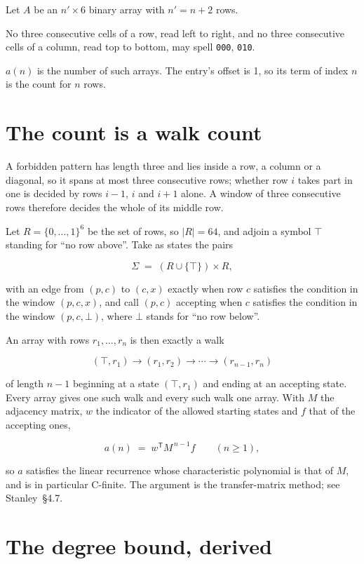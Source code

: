 \documentclass[11pt]{article}
\theoremstyle{definition}
\begin{document}
Let $A$ be an $n' \times 6$ binary array with $n' = n + 2$ rows.

No three consecutive cells of a row, read left to right, and no three consecutive cells of a column, read top to bottom, may spell \texttt{000}, \texttt{010}.

$a(n)$ is the number of such arrays. The entry's offset is 1, so its term of index $n$ is the count for $n$ rows.

\section{The count is a walk count}

A forbidden pattern has length three and lies inside a row, a column or a diagonal, so it spans at most three consecutive rows; whether row $i$ takes part in one is decided by rows $i-1$, $i$ and $i+1$ alone. A window of three consecutive rows therefore decides the whole of its middle row.

Let $R = \{0,\dots,1\}^{6}$ be the set of rows, so $|R| = 64$, and adjoin a symbol $\top$ standing for ``no row above''. Take as states the pairs

\[\Sigma \;=\; (R \cup \{\top\}) \times R,\]

with an edge from $(p,c)$ to $(c,x)$ exactly when row $c$ satisfies the condition in the window $(p,c,x)$, and call $(p,c)$ accepting when $c$ satisfies the condition in the window $(p,c,\bot)$, where $\bot$ stands for ``no row below''.

An array with rows $r_1,\dots,r_n$ is then exactly a walk

\[(\top,r_1) \to (r_1,r_2) \to \cdots \to (r_{n-1},r_n)\]

of length $n-1$ beginning at a state $(\top,r_1)$ and ending at an accepting state. Every array gives one such walk and every such walk one array. With $M$ the adjacency matrix, $w$ the indicator of the allowed starting states and $f$ that of the accepting ones,

\[a(n) \;=\; w^{\mathsf T} M^{\,n-1} f \qquad (n \ge 1),\]

so $a$ satisfies the linear recurrence whose characteristic polynomial is that of $M$, and is in particular C-finite. The argument is the transfer-matrix method; see Stanley~\S4.7.

\section{The degree bound, derived}
\end{document}
